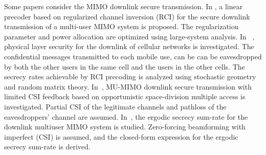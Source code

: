 \documentclass[12pt,journal,draftclsnofoot,onecolumn]{IEEEtran}
\begin{document}
%


Some papers consider the MIMO downlink secure transmission. In \cite{geraci2012secrecy}, a linear precoder based on regularized channel inversion (RCI) for the secure downlink transmission of a multi-user MIMO system is proposed. The regularization
parameter and power allocation are optimized using large-system analysis. In ~\cite{geraci2014physical}, physical layer security for the downlink of cellular networks is investigated. The confidential messages transmitted to each mobile use, can be can be eavesdropped by both the other users in the same cell and the users in the other cells. The secrecy rates achievable by
RCI precoding  is analyzed using stochastic geometry
and random matrix theory. In~\cite{chen2015mode}, 
MU-MIMO downlink secure transmission with limited CSI feedback
based on opportunistic space-division multiple access is investigated. Partial CSI of the legitimate channels and pathloss of the eavesdroppers' channel are assumed. In~\cite{zou_improving_2015}, the ergodic secrecy sum-rate for the downlink multiuser MIMO system is studied. Zero-forcing beamforming with imperfect (CSI) is assumed, and the closed-form expression for the ergodic
secrecy sum-rate is derived. 
\end{document}
